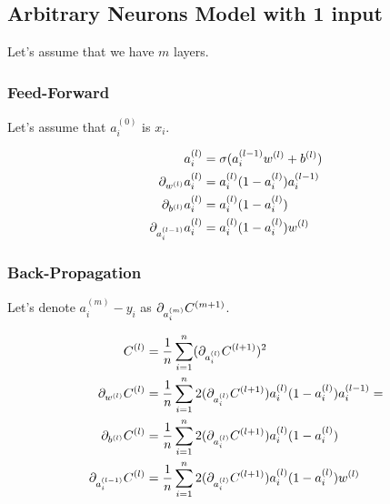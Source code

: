 \documentclass{article}
\begin{document}
\subsection{Arbitrary Neurons Model with 1 input}

Let's assume that we have $m$ layers.

\subsubsection{Feed-Forward}

Let's assume that $a_i^{(0)}$ is $x_i$.

\begin{align}
  a_i^{(l)} &= \sigma(a_i^{(l-1)}w^{(l)} + b^{(l)}) \\
  \pd[w^{(l)}]a_i^{(l)} &= a_i^{(l)}(1 - a_i^{(l)})a_i^{(l-1)} \\
  \pd[b^{(l)}]a_i^{(l)} &= a_i^{(l)}(1 - a_i^{(l)}) \\
  \pd[a_i^{(l-1)}]a_i^{(l)} &= a_i^{(l)}(1 - a_i^{(l)})w^{(l)}
\end{align}

\subsubsection{Back-Propagation}

Let's denote $a_i^{(m)} - y_i$ as $\pd[a_i^{(m)}]C^{(m+1)}$.

\begin{align}
  C^{(l)} &= \avgsum[i, n] (\pd[a_i^{(l)}]C^{(l+1)})^2 \\
  \pd[w^{(l)}]C^{(l)} &= \avgsum[i, n] 2(\pd[a_i^{(l)}]C^{(l+1)})a_i^{(l)}(1 - a_i^{(l)})a_i^{(l-1)} =\\
  \pd[b^{(l)}]C^{(l)} &= \avgsum[i, n] 2(\pd[a_i^{(l)}]C^{(l+1)})a_i^{(l)}(1 - a_i^{(l)}) \\
  \pd[a_i^{(l-1)}]C^{(l)} &= \avgsum[i, n] 2(\pd[a_i^{(l)}]C^{(l+1)})a_i^{(l)}(1 - a_i^{(l)})w^{(l)}
\end{align}
\end{document}
